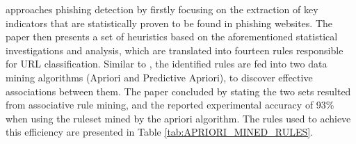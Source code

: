 \cite{INTELLIGENT_RULE_MINING} approaches phishing detection by firstly focusing
on the extraction of key indicators that are statistically proven to be found in
phishing websites. The paper then presents a set of heuristics based on the
aforementioned statistical investigations and analysis, which are translated
into fourteen rules responsible for URL classification. Similar to
\cite{RULE_BASED_CLASSIFICATION}, the identified rules are fed into two data
mining algorithms (Apriori and Predictive Apriori), to discover effective
associations between them. The paper concluded by stating the two sets resulted
from associative rule mining, and the reported experimental accuracy of 93\%
when using the ruleset mined by the apriori algorithm. The rules used to achieve
this efficiency are presented in Table \ref{tab:APRIORI_MINED_RULES}.


